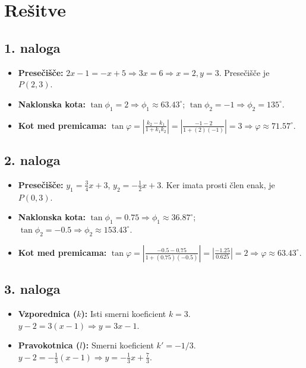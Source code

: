 \documentclass[12pt, a4paper]{article}
\begin{document}
\newpage

\section{Rešitve}

\subsection*{1. naloga}
\begin{itemize}
    \item \textbf{Presečišče:} $2x - 1 = -x + 5 \Rightarrow 3x = 6 \Rightarrow x = 2, y = 3$. Presečišče je $P(2, 3)$.
    \item \textbf{Naklonska kota:} $\tan \phi_1 = 2 \Rightarrow \phi_1 \approx 63.43^\circ$; $\tan \phi_2 = -1 \Rightarrow \phi_2 = 135^\circ$.
    \item \textbf{Kot med premicama:} $\tan \varphi = \left| \frac{k_2 - k_1}{1 + k_1 k_2} \right| = \left| \frac{-1 - 2}{1 + (2)(-1)} \right| = 3 \Rightarrow \varphi \approx 71.57^\circ$.
\end{itemize}

\subsection*{2. naloga}
\begin{itemize}
    \item \textbf{Presečišče:} $y_1 = \frac{3}{4}x + 3$, $y_2 = -\frac{1}{2}x + 3$. Ker imata prosti člen enak, je $P(0, 3)$.
    \item \textbf{Naklonska kota:} $\tan \phi_1 = 0.75 \Rightarrow \phi_1 \approx 36.87^\circ$; $\tan \phi_2 = -0.5 \Rightarrow \phi_2 \approx 153.43^\circ$.
    \item \textbf{Kot med premicama:} $\tan \varphi = \left| \frac{-0.5 - 0.75}{1 + (0.75)(-0.5)} \right| = \left| \frac{-1.25}{0.625} \right| = 2 \Rightarrow \varphi \approx 63.43^\circ$.
\end{itemize}

\subsection*{3. naloga}
\begin{itemize}
    \item \textbf{Vzporednica ($k$):} Isti smerni koeficient $k=3$. $y - 2 = 3(x - 1) \Rightarrow y = 3x - 1$.
    \item \textbf{Pravokotnica ($l$):} Smerni koeficient $k' = -1/3$. $y - 2 = -\frac{1}{3}(x - 1) \Rightarrow y = -\frac{1}{3}x + \frac{7}{3}$.
\end{itemize}
\end{document}
